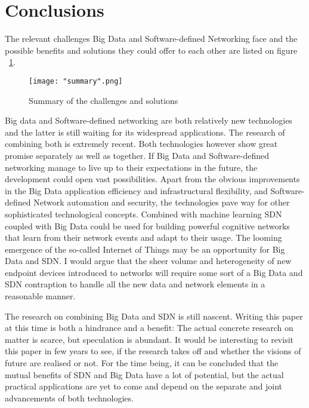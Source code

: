 \documentclass{acm_proc_article-sp}
\begin{document}
\section{Conclusions}

The relevant challenges Big Data and Software-defined Networking face and the possible benefits and solutions they could offer to each other are listed on figure ~\ref{fig:summary}.

\begin{figure}[ht]
\centering
{}
\texttt{[image: "summary".png]}
\caption{Summary of the challenges and solutions}
\label{fig:summary}
\end{figure} 


Big data and Software-defined networking are both relatively new technologies and the latter is still waiting for its widespread applications. The research of combining both is extremely recent. Both technologies however show great promise separately as well as together. If Big Data and Software-defined networking manage to live up to their expectations in the future, the development could open vast possibilities. Apart from the obvious improvements in the Big Data application efficiency and infrastructural flexibility, and Software-defined Network automation and security, the technologies pave way for other sophisticated technological concepts. Combined with machine learning SDN coupled with Big Data could be used for building powerful cognitive networks that learn from their network events and adapt to their usage. The looming emergence of the so-called Internet of Things may be an opportunity for Big Data and SDN. I would argue that the sheer volume and heterogeneity of new endpoint devices introduced to networks will require some sort of a Big Data and SDN contraption to handle all the new data and network elements in a reasonable manner.

The research on combining Big Data and SDN is still nascent. Writing this paper at this time is both a hindrance and a benefit: The actual concrete research on matter is scarce, but speculation is abundant. It would be interesting to revisit this paper in few years to see, if the research takes off and whether the visions of future are realised or not. For the time being, it can be concluded that the mutual benefits of SDN and Big Data have a lot of potential, but the actual practical applications are yet to come and depend on the separate and joint advancements of both technologies.



\end{document}
